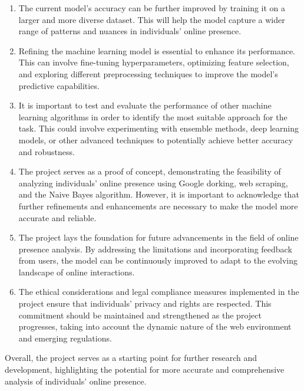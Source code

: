 \documentclass[openany]{report}
\begin{document}
\begin{enumerate}
    \item The current model's accuracy can be further improved by training it on a larger and more diverse dataset. This will help the model capture a wider range of patterns and nuances in individuals' online presence.

    \item Refining the machine learning model is essential to enhance its performance. This can involve fine-tuning hyperparameters, optimizing feature selection, and exploring different preprocessing techniques to improve the model's predictive capabilities.

    \item It is important to test and evaluate the performance of other machine learning algorithms in order to identify the most suitable approach for the task. This could involve experimenting with ensemble methods, deep learning models, or other advanced techniques to potentially achieve better accuracy and robustness.

    \item The project serves as a proof of concept, demonstrating the feasibility of analyzing individuals' online presence using Google dorking, web scraping, and the Naive Bayes algorithm. However, it is important to acknowledge that further refinements and enhancements are necessary to make the model more accurate and reliable.

    \item The project lays the foundation for future advancements in the field of online presence analysis. By addressing the limitations and incorporating feedback from users, the model can be continuously improved to adapt to the evolving landscape of online interactions.

    \item The ethical considerations and legal compliance measures implemented in the project ensure that individuals' privacy and rights are respected. This commitment should be maintained and strengthened as the project progresses, taking into account the dynamic nature of the web environment and emerging regulations.

\end{enumerate}

Overall, the project serves as a starting point for further research and development, highlighting the potential for more accurate and comprehensive analysis of individuals' online presence.
\end{document}
